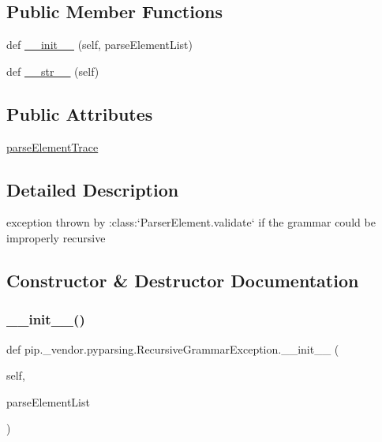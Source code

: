 \subsection*{Public Member Functions}
\begin{DoxyCompactItemize}
\item 
def \hyperlink{classpip_1_1__vendor_1_1pyparsing_1_1RecursiveGrammarException_a999964ebe7697ea7ad91d350f4320904}{\+\_\+\+\_\+init\+\_\+\+\_\+} (self, parse\+Element\+List)
\item 
def \hyperlink{classpip_1_1__vendor_1_1pyparsing_1_1RecursiveGrammarException_a0bc334a1bf1100bb96df79b156a9a9b1}{\+\_\+\+\_\+str\+\_\+\+\_\+} (self)
\end{DoxyCompactItemize}
\subsection*{Public Attributes}
\begin{DoxyCompactItemize}
\item 
\hyperlink{classpip_1_1__vendor_1_1pyparsing_1_1RecursiveGrammarException_a3903a3db278121d16e353916110e33ae}{parse\+Element\+Trace}
\end{DoxyCompactItemize}


\subsection{Detailed Description}
\begin{DoxyVerb}exception thrown by :class:`ParserElement.validate` if the
grammar could be improperly recursive
\end{DoxyVerb}
 

\subsection{Constructor \& Destructor Documentation}
\mbox{\label{classpip_1_1__vendor_1_1pyparsing_1_1RecursiveGrammarException_a999964ebe7697ea7ad91d350f4320904}} 
\subsubsection{\texorpdfstring{\+\_\+\+\_\+init\+\_\+\+\_\+()}{\_\_init\_\_()}}
{\footnotesize\ttfamily def pip.\+\_\+vendor.\+pyparsing.\+Recursive\+Grammar\+Exception.\+\_\+\+\_\+init\+\_\+\+\_\+ (\begin{DoxyParamCaption}\item[{}]{self,  }\item[{}]{parse\+Element\+List }\end{DoxyParamCaption})}




